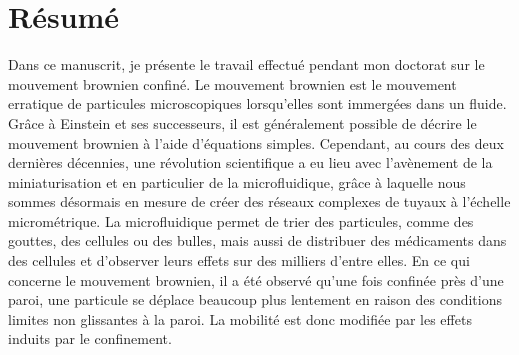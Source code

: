 \newpage

\section*{Résumé}

Dans ce manuscrit, je présente le travail effectué pendant mon doctorat sur le mouvement brownien confiné. Le mouvement brownien est le mouvement erratique de particules microscopiques lorsqu'elles sont immergées dans un fluide. Grâce à Einstein et ses successeurs, il est généralement possible de décrire le mouvement brownien à l'aide d'équations simples. Cependant, au cours des deux dernières décennies, une révolution scientifique a eu lieu avec l'avènement de la miniaturisation et en particulier de la microfluidique, grâce à laquelle nous sommes désormais en mesure de créer des réseaux complexes de tuyaux à l'échelle micrométrique. La microfluidique permet de trier des particules, comme des gouttes, des cellules ou des bulles, mais aussi de distribuer des médicaments dans des cellules et d'observer leurs effets sur des milliers d'entre elles. En ce qui concerne le mouvement brownien, il a été observé qu'une fois confinée près d'une paroi, une particule se déplace beaucoup plus lentement en raison des conditions limites non glissantes à la paroi. La mobilité est donc modifiée par les effets induits par le confinement.

